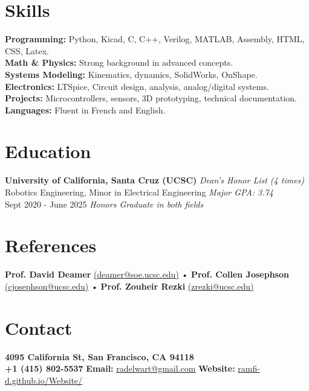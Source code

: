 \documentclass[a4paper,9pt]{article}
\begin{document}
\section*{Skills}
\small
\textbf{Programming:} Python, Kicad, C, C++, Verilog, MATLAB, Assembly, HTML, CSS, Latex. \\
\textbf{Math \& Physics:} Strong background in advanced concepts. \\
\textbf{Systems Modeling:} Kinematics, dynamics, SolidWorks, OnShape. \\
\textbf{Electronics:} LTSpice, Circuit design, analysis, analog/digital systems. \\
\textbf{Projects:} Microcontrollers, sensors, 3D prototyping, technical documentation. \\
\textbf{Languages:} Fluent in French and English.
\normalsize

\section*{Education}
\small
\textbf{University of California, Santa Cruz (UCSC)} \hfill \textit{Dean's Honor List (4 times)} \\
Robotics Engineering, Minor in Electrical Engineering \hfill \textit{Major GPA: 3.74} \\
Sept 2020 - June 2025 \hfill \textit{Honors Graduate in both fields}

\section*{References}
\footnotesize
\textbf{Prof. David Deamer} \href{mailto:deamer@soe.ucsc.edu}{(deamer@soe.ucsc.edu)} • \textbf{Prof. Collen Josephson} \href{mailto:cjosephson@ucsc.edu}{(cjosephson@ucsc.edu)} • \textbf{Prof. Zouheir Rezki} \href{mailto:zrezki@ucsc.edu}{(zrezki@ucsc.edu)}
\normalsize

\section*{Contact}
\textbf{4095 California St, San Francisco, CA 94118} \\
\textbf{+1 (415) 802-5537} 
\textbf{Email:} \href{mailto:radelwart@gmail.com}{radelwart@gmail.com}\normalsize
\textbf{Website:} \href{https://ramfi-d.github.io/Website/}{ramfi-d.github.io/Website/}
\normalsize
\end{document}
